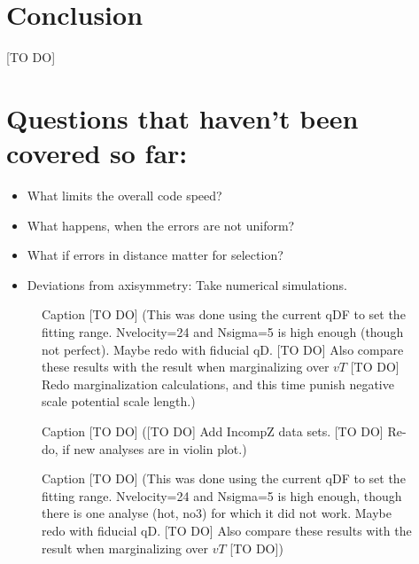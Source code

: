 \documentclass[12pt,preprint]{aastex}
\begin{document}
\section{Conclusion}

[TO DO]

\section{Questions that haven't been covered so far:}

\begin{itemize}
\item What limits the overall code speed?
\item What happens, when the errors are not uniform?
\item What if errors in distance matter for selection?
\item Deviations from axisymmetry: Take numerical simulations.
\end{itemize}
















\begin{figure}
\caption{Caption [TO DO] (This was done using the current qDF to set the fitting range. Nvelocity=24 and Nsigma=5 is high enough (though not perfect). Maybe redo with fiducial qD. [TO DO] Also compare these results with the result when marginalizing over $vT$ [TO DO] Redo marginalization calculations, and this time punish negative scale potential scale length.)} 
\end{figure}

\begin{figure}
\caption{Caption [TO DO] ([TO DO] Add IncompZ data sets. [TO DO] Re-do, if new analyses are in violin plot.)} 
\end{figure}


\begin{figure}
\caption{Caption [TO DO] (This was done using the current qDF to set the fitting range. Nvelocity=24 and Nsigma=5 is high enough, though there is one analyse (hot, no3) for which it did not work. Maybe redo with fiducial qD. [TO DO] Also compare these results with the result when marginalizing over $vT$ [TO DO])} 
\end{figure}
\end{document}
